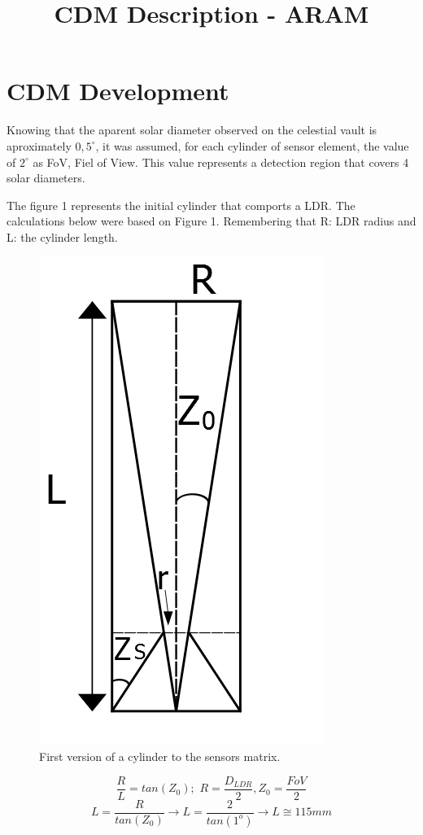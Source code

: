 \documentclass[a4paper,12pt]{article}
\title{CDM Description - ARAM}
\begin{document}
	\maketitle
	\section{CDM Development}
	Knowing that the aparent solar diameter observed on the celestial vault is aproximately $0,5^{\circ}$, it was assumed, for each cylinder of sensor element, the value of $2^{\circ}$ as  FoV, Fiel of View. This value represents a detection region that covers 4 solar diameters. 
	
	The figure 1 represents the initial cylinder that comports a LDR. The calculations below were based on Figure 1. Remembering that R: LDR radius and L: the cylinder length.

\begin{figure}[htb] 
	\centering
	\includegraphics[scale=0.5]{MCD_1.jpg}
	\caption{First version of a cylinder to the sensors matrix.}
\end{figure}

$$\frac{R}{L} = tan(Z_{0}) ; \,\,   R = \frac{D_{LDR}}{2}, Z_{0} = \frac{FoV}{2}$$
$$L = \frac{R}{tan(Z_{0})} \longrightarrow L = \frac{2}{tan(1^{o})}  \longrightarrow L \cong 115 mm$$ 
\end{document}
